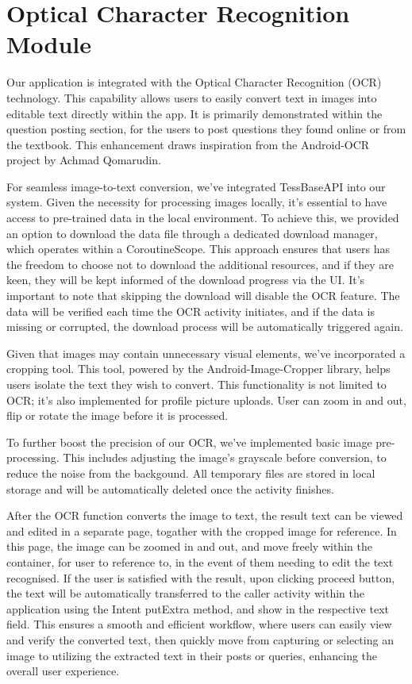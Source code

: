\section{Optical Character Recognition Module}
Our application is integrated with the Optical Character Recognition (OCR) technology. This capability allows users to easily convert text in images into editable text directly within the app. It is primarily demonstrated within the question posting section, for the users to post questions they found online or from the textbook. This enhancement draws inspiration from the Android-OCR project by Achmad Qomarudin.

For seamless image-to-text conversion, we've integrated TessBaseAPI into our system. Given the necessity for processing images locally, it's essential to have access to pre-trained data in the local environment. To achieve this, we provided an option to download the data file through a dedicated download manager, which operates within a CoroutineScope. This approach ensures that users has the freedom to choose not to download the additional resources, and if they are keen, they will be kept informed of the download progress via the UI. It's important to note that skipping the download will disable the OCR feature. The data will be verified each time the OCR activity initiates, and if the data is missing or corrupted, the download process will be automatically triggered again.

Given that images may contain unnecessary visual elements, we've incorporated a cropping tool. This tool, powered by the Android-Image-Cropper library, helps users isolate the text they wish to convert. This functionality is not limited to OCR; it's also implemented for profile picture uploads. User can zoom in and out, flip or rotate the image before it is processed.

To further boost the precision of our OCR, we've implemented basic image pre-processing. This includes adjusting the image's grayscale before conversion, to reduce the noise from the backgound. All temporary files are stored in local storage and will be automatically deleted once the activity finishes.

After the OCR function converts the image to text, the result text can be viewed and edited in a separate page, togather with the cropped image for reference. In this page, the image can be zoomed in and out, and move freely within the container, for user to reference to, in the event of them needing to edit the text recognised. If the user is satisfied with the result, upon clicking proceed button, the text will be automatically transferred to the caller activity within the application using the Intent putExtra method, and show in the respective text field. This ensures a smooth and efficient workflow, where users can easily view and verify the converted text, then quickly move from capturing or selecting an image to utilizing the extracted text in their posts or queries, enhancing the overall user experience.


